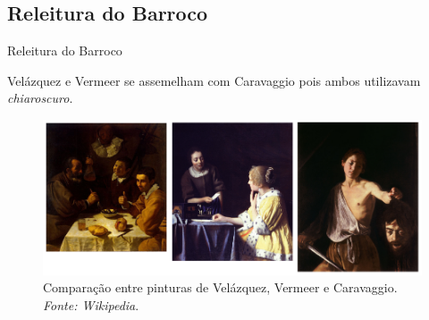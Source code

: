 \documentclass{beamer}
\begin{document}
\subsection{Releitura do Barroco}
\begin{frame}{Releitura do Barroco}

Velázquez e Vermeer se assemelham com Caravaggio pois ambos
  utilizavam \textit{chiaroscuro}.

\begin{figure}[h!]
  \begin{center}
    \includegraphics[width=1.0\textwidth]{figs/compara_vel_ver_car.png}
    \caption{Comparação entre pinturas de Velázquez, Vermeer e Caravaggio. \textit{Fonte: Wikipedia}.}
\end{center}
\end{figure}

\end{frame}
\end{document}
